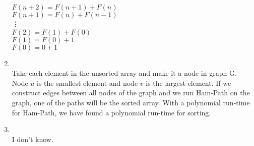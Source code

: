 \documentclass[11pt]{article}
\begin{document}
\begin{enumerate}
            $F(n+2) = F(n+1) + F(n)$\\
            $F(n+1) = F(n) + F(n-1)$\\
            \vdots\\
            $F(2) = F(1) + F(0)$\\
            $F(1) = F(0) + 1$\\
            $F(0) = 0+1$\\
            \item \\
            Take each element in the unsorted array and make it a node in graph G.  Node $u$ is the smallest
            element and node $v$ is the largest element.  If we construct edges between all nodes of the graph
            and we run Ham-Path on the graph, one of the paths will be the sorted array.  With a polynomial run-time
            for Ham-Path, we have found a polynomial run-time for sorting.
            \item \\ I don't know.\\
            \end{enumerate}

                                
\end{document}
